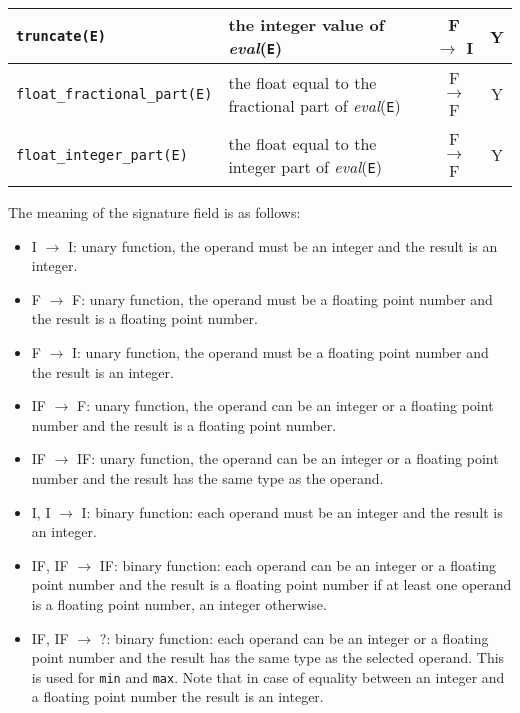 \begin{supertabular}{|l|L{7.5cm}|c|c|}
\texttt{truncate(E)} & the integer value of \textit{eval}(\texttt{E}) & F
$\rightarrow$ I & Y \\

\hline

\texttt{float\_fractional\_part(E)} & the float equal to the fractional part
of \textit{eval}(\texttt{E}) & F $\rightarrow$ F & Y \\

\hline

\texttt{float\_integer\_part(E)} & the float equal to the integer part of
\textit{eval}(\texttt{E}) & F $\rightarrow$ F & Y \\

\hline
\end{supertabular}

The meaning of the signature field is as follows:

\begin{itemize}

\item I $\rightarrow$ I: unary function, the operand must be an integer and
the result is an integer.

\item F $\rightarrow$ F: unary function, the operand must be a floating
point number and the result is a floating point number.

\item F $\rightarrow$ I: unary function, the operand must be a floating
point number and the result is an integer.

\item IF $\rightarrow$ F: unary function, the operand can be an integer or a
floating point number and the result is a floating point number.

\item IF $\rightarrow$ IF: unary function, the operand can be an integer or
a floating point number and the result has the same type as the operand.

\item I, I $\rightarrow$ I: binary function: each operand must be an integer
and the result is an integer.

\item IF, IF $\rightarrow$ IF: binary function: each operand can be an
integer or a floating point number and the result is a floating point number
if at least one operand is a floating point number, an integer otherwise.

\item IF, IF $\rightarrow$ ?: binary function: each operand can be an
integer or a floating point number and the result has the same type as the
selected operand. This is used for \texttt{min} and \texttt{max}. Note that
in case of equality between an integer and a floating point number the
result is an integer.

\end{itemize}

